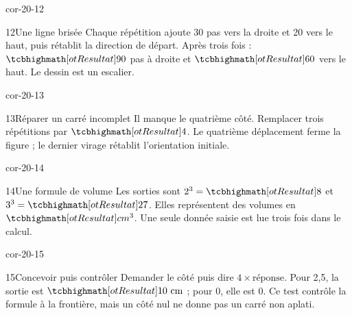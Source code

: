 \begin{blocLivre}{cor-20-12}\begin{corrige}{12}{Une ligne brisée}
Chaque répétition ajoute 30 pas vers la droite et 20 vers le haut, puis rétablit la direction de départ. Après trois fois : $\res{90}$ pas à droite et $\res{60}$ vers le haut. Le dessin est un escalier.
\label{fig-cor-20-12}
\end{corrige}\end{blocLivre}
\begin{blocLivre}{cor-20-13}\begin{corrige}{13}{Réparer un carré incomplet}
Il manque le quatrième côté. Remplacer trois répétitions par $\res4$. Le quatrième déplacement ferme la figure ; le dernier virage rétablit l’orientation initiale.
\label{fig-cor-20-13}
\end{corrige}\end{blocLivre}
\begin{blocLivre}{cor-20-14}\begin{corrige}{14}{Une formule de volume}
Les sorties sont $2^3=\res8$ et $3^3=\res{27}$. Elles représentent des volumes en $\res{cm^3}$. Une seule donnée saisie est lue trois fois dans le calcul.
\label{fig-cor-20-14}
\end{corrige}\end{blocLivre}
\begin{blocLivre}{cor-20-15}\begin{corrige}{15}{Concevoir puis contrôler}
Demander le côté puis dire $4\times\text{réponse}$. Pour 2,5, la sortie est $\res{10\ \mathrm{cm}}$ ; pour 0, elle est 0. Ce test contrôle la formule à la frontière, mais un côté nul ne donne pas un carré non aplati.
\label{fig-cor-20-15}
\end{corrige}\end{blocLivre}
